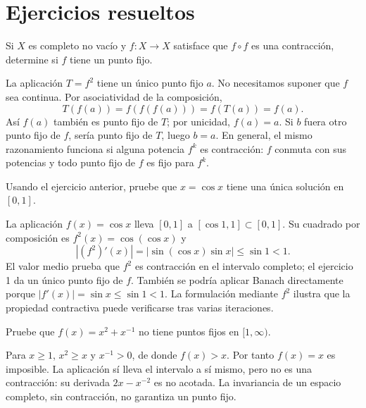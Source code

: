 \section{Ejercicios resueltos}
\begin{ejercicio}
Si $X$ es completo no vacío y $f:X\to X$ satisface que $f\circ f$ es una contracción, determine si $f$ tiene un punto fijo.
\end{ejercicio}
\begin{solucion}
La aplicación $T=f^2$ tiene un único punto fijo $a$. No necesitamos suponer que $f$ sea continua. Por asociatividad de la composición,
\[
 T(f(a))=f(f(f(a)))=f(T(a))=f(a).
\]
Así $f(a)$ también es punto fijo de $T$; por unicidad, $f(a)=a$. Si $b$ fuera otro punto fijo de $f$, sería punto fijo de $T$, luego $b=a$. En general, el mismo razonamiento funciona si alguna potencia $f^k$ es contracción: $f$ conmuta con sus potencias y todo punto fijo de $f$ es fijo para $f^k$.
\end{solucion}

\begin{ejercicio}
Usando el ejercicio anterior, pruebe que $x=\cos x$ tiene una única solución en $[0,1]$.
\end{ejercicio}
\begin{solucion}
La aplicación $f(x)=\cos x$ lleva $[0,1]$ a $[\cos1,1]\subset[0,1]$. Su cuadrado por composición es $f^2(x)=\cos(\cos x)$ y
\[
 |(f^2)'(x)|=|\sin(\cos x)\sin x|\leq\sin1<1.
\]
El valor medio prueba que $f^2$ es contracción en el intervalo completo; el ejercicio 1 da un único punto fijo de $f$. También se podría aplicar Banach directamente porque $|f'(x)|=\sin x\leq\sin1<1$. La formulación mediante $f^2$ ilustra que la propiedad contractiva puede verificarse tras varias iteraciones.
\end{solucion}

\begin{ejercicio}
Pruebe que $f(x)=x^2+x^{-1}$ no tiene puntos fijos en $[1,\infty)$.
\end{ejercicio}
\begin{solucion}
Para $x\geq1$, $x^2\geq x$ y $x^{-1}>0$, de donde $f(x)>x$. Por tanto $f(x)=x$ es imposible. La aplicación sí lleva el intervalo a sí mismo, pero no es una contracción: su derivada $2x-x^{-2}$ es no acotada. La invariancia de un espacio completo, sin contracción, no garantiza un punto fijo.
\end{solucion}

